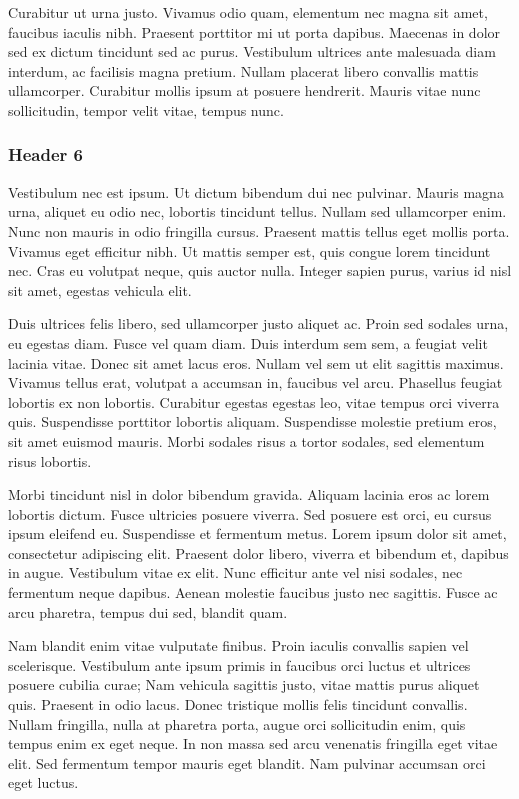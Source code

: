 \documentclass{article}
\begin{document}
Curabitur ut urna justo. Vivamus odio quam, elementum nec magna sit amet, faucibus iaculis nibh. Praesent porttitor mi ut porta dapibus. Maecenas in dolor sed ex dictum tincidunt sed ac purus. Vestibulum ultrices ante malesuada diam interdum, ac facilisis magna pretium. Nullam placerat libero convallis mattis ullamcorper. Curabitur mollis ipsum at posuere hendrerit. Mauris vitae nunc sollicitudin, tempor velit vitae, tempus nunc.


\subsubsection{Header 6}\label{H2507771}



Vestibulum nec est ipsum. Ut dictum bibendum dui nec pulvinar. Mauris magna urna, aliquet eu odio nec, lobortis tincidunt tellus. Nullam sed ullamcorper enim. Nunc non mauris in odio fringilla cursus. Praesent mattis tellus eget mollis porta. Vivamus eget efficitur nibh. Ut mattis semper est, quis congue lorem tincidunt nec. Cras eu volutpat neque, quis auctor nulla. Integer sapien purus, varius id nisl sit amet, egestas vehicula elit.


Duis ultrices felis libero, sed ullamcorper justo aliquet ac. Proin sed sodales urna, eu egestas diam. Fusce vel quam diam. Duis interdum sem sem, a feugiat velit lacinia vitae. Donec sit amet lacus eros. Nullam vel sem ut elit sagittis maximus. Vivamus tellus erat, volutpat a accumsan in, faucibus vel arcu. Phasellus feugiat lobortis ex non lobortis. Curabitur egestas egestas leo, vitae tempus orci viverra quis. Suspendisse porttitor lobortis aliquam. Suspendisse molestie pretium eros, sit amet euismod mauris. Morbi sodales risus a tortor sodales, sed elementum risus lobortis.


Morbi tincidunt nisl in dolor bibendum gravida. Aliquam lacinia eros ac lorem lobortis dictum. Fusce ultricies posuere viverra. Sed posuere est orci, eu cursus ipsum eleifend eu. Suspendisse et fermentum metus. Lorem ipsum dolor sit amet, consectetur adipiscing elit. Praesent dolor libero, viverra et bibendum et, dapibus in augue. Vestibulum vitae ex elit. Nunc efficitur ante vel nisi sodales, nec fermentum neque dapibus. Aenean molestie faucibus justo nec sagittis. Fusce ac arcu pharetra, tempus dui sed, blandit quam.


Nam blandit enim vitae vulputate finibus. Proin iaculis convallis sapien vel scelerisque. Vestibulum ante ipsum primis in faucibus orci luctus et ultrices posuere cubilia curae; Nam vehicula sagittis justo, vitae mattis purus aliquet quis. Praesent in odio lacus. Donec tristique mollis felis tincidunt convallis. Nullam fringilla, nulla at pharetra porta, augue orci sollicitudin enim, quis tempus enim ex eget neque. In non massa sed arcu venenatis fringilla eget vitae elit. Sed fermentum tempor mauris eget blandit. Nam pulvinar accumsan orci eget luctus.
\end{document}
